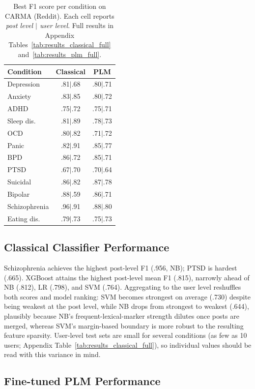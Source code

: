 \documentclass[11pt]{article}
\begin{document}
\begin{table}[t]
\centering
\small
\begin{tabular}{lcc}
\toprule
\textbf{Condition} & \textbf{Classical} & \textbf{PLM} \\
\midrule
Depression & .81$|$.68 & .80$|$.71 \\
Anxiety & .83$|$.85 & .80$|$.72 \\
ADHD & .75$|$.72 & .75$|$.71 \\
Sleep dis. & .81$|$.89 & .78$|$.73 \\
OCD & .80$|$.82 & .71$|$.72 \\
Panic & .82$|$.91 & .85$|$.77 \\
BPD & .86$|$.72 & .85$|$.71 \\
PTSD & .67$|$.70 & .70$|$.64 \\
Suicidal & .86$|$.82 & .87$|$.78 \\
Bipolar & .88$|$.59 & .86$|$.71 \\
Schizophrenia & .96$|$.91 & .88$|$.80 \\
Eating dis. & .79$|$.73 & .75$|$.73 \\
\bottomrule
\end{tabular}
\caption{Best F1 score per condition on CARMA (Reddit). Each cell reports \textit{post level $|$ user level}. Full results in Appendix Tables~\ref{tab:results_classical_full} and~\ref{tab:results_plm_full}.}
\label{tab:results_summary}
\end{table}

\subsection{Classical Classifier Performance}

Schizophrenia achieves the highest post-level F1 (.956, NB); PTSD is hardest (.665). XGBoost attains the highest post-level mean F1 (.815), narrowly ahead of NB (.812), LR (.798), and SVM (.764). Aggregating to the user level reshuffles both scores and model ranking: SVM becomes strongest on average (.730) despite being weakest at the post level, while NB drops from strongest to weakest (.644), plausibly because NB's frequent-lexical-marker strength dilutes once posts are merged, whereas SVM's margin-based boundary is more robust to the resulting feature sparsity. User-level test sets are small for several conditions (as few as 10 users; Appendix Table~\ref{tab:results_classical_full}), so individual values should be read with this variance in mind.

\subsection{Fine-tuned PLM Performance}
\end{document}
